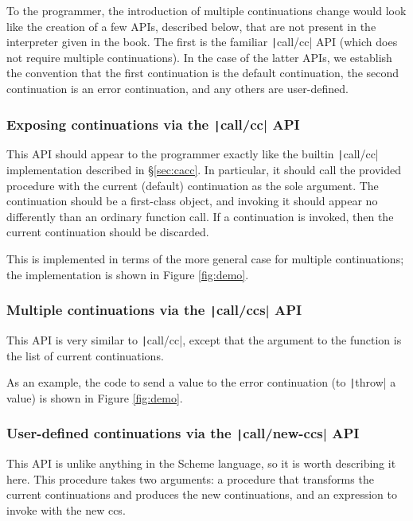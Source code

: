 \documentclass[]{article}
\begin{document}
To the programmer, the introduction of multiple continuations change would look like the creation of a few APIs, described below, that are not present in the interpreter given in the book. The first is the familiar \texttt|call/cc| API (which does not require multiple continuations). In the case of the latter APIs, we establish the convention that the first continuation is the default continuation, the second continuation is an error continuation, and any others are user-defined.

\subsubsection{Exposing continuations via the \texttt|call/cc| API}
\label{sec:imcc}

This API should appear to the programmer exactly like the builtin \texttt|call/cc| implementation described in \S{\ref{sec:cacc}}. In particular, it should call the provided procedure with the current (default) continuation as the sole argument. The continuation should be a first-class object, and invoking it should appear no differently than an ordinary function call. If a continuation is invoked, then the current continuation should be discarded.

This is implemented in terms of the more general case for multiple continuations; the implementation is shown in Figure \ref{fig:demo}.

\subsubsection{Multiple continuations via the \texttt|call/ccs| API}
\label{sec:iccs}

This API is very similar to \texttt|call/cc|, except that the argument to the function is the list of current continuations.

As an example, the code to send a value to the error continuation (to \texttt|throw| a value) is shown in Figure \ref{fig:demo}.

\subsubsection{User-defined continuations via the \texttt|call/new-ccs| API}
\label{sec:icnc}

This API is unlike anything in the Scheme language, so it is worth describing it here. This procedure takes two arguments: a procedure that transforms the current continuations and produces the new continuations, and an expression to invoke with the new ccs.
\end{document}
